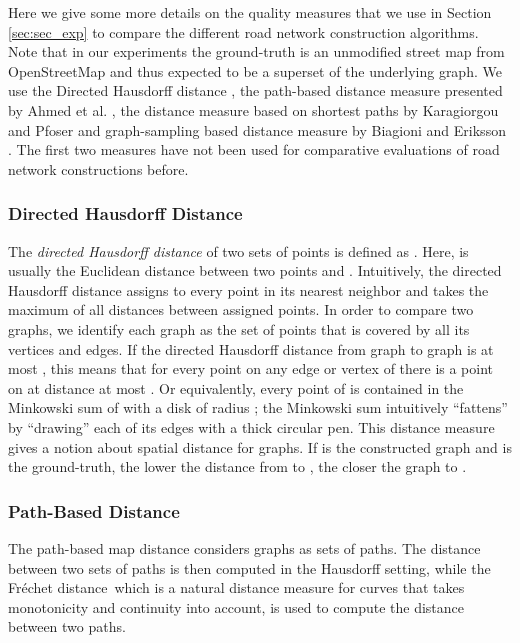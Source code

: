 \documentclass[natbib]{svjour3}                    \smartqed  \usepackage[table]{xcolor}
\newcommand{\Frd}{Fr\'echet distance}
\begin{document}
Here we give some more details on the quality measures that we use in Section \ref{sec:sec_exp} to compare the different road network construction algorithms. Note that in our experiments the ground-truth  is an unmodified street map from OpenStreetMap and thus expected to be a superset of the underlying graph. We use the Directed Hausdorff distance \cite{ag-dgsmi-99}, the path-based distance measure presented by Ahmed et al. \cite{aw-SIGSPATIAL-13}, the distance measure based on shortest paths by Karagiorgou and Pfoser \cite{Karagiorgou:2012:VTD:2424321.2424334} and graph-sampling based distance measure 
by Biagioni and Eriksson \cite{be-irmgp-12}. The first two measures have not been used for comparative evaluations of road network constructions before.

\subsubsection{Directed Hausdorff Distance \protect\cite{ag-dgsmi-99}}
The {\em directed Hausdorff distance}
of two sets of points  is defined as . Here,
 is usually the Euclidean distance between two points  and . Intuitively, the directed Hausdorff distance assigns to every point in  its nearest neighbor  and takes the maximum of all distances between assigned points.
In order to compare two graphs, we identify each graph as the set of points that is covered by all its vertices and edges. 
If the directed Hausdorff distance from graph  to graph  is at most , this means that for every point on any edge or vertex of  there is a point on  at distance at most . 
Or equivalently, every point of  is contained in the Minkowski sum of  with a disk of radius ; the Minkowski sum intuitively ``fattens''  by ``drawing'' each of its edges with a thick circular pen.  
This distance measure gives a notion about spatial distance for graphs. 
If  is the constructed graph and  is the ground-truth, the lower the distance from  to , the closer the graph  to .





\subsubsection{Path-Based Distance \protect\cite{aw-SIGSPATIAL-13}}
The path-based map distance considers graphs as sets of paths. The distance between two sets of paths is then computed in the Hausdorff setting, while the \Frd\, which is a natural distance measure for curves that takes monotonicity and continuity into account, is used to compute the distance between two paths. 
\end{document}
